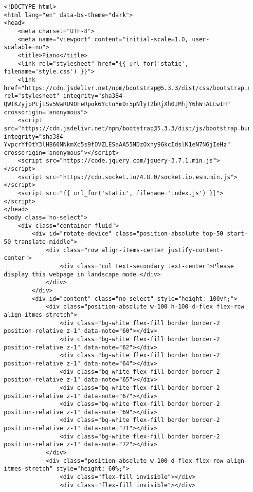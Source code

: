 \documentclass[../main.tex]{subfiles}
\begin{document}
\begin{verbatim}
<!DOCTYPE html>
<html lang="en" data-bs-theme="dark">
<head>
    <meta charset="UTF-8">
    <meta name="viewport" content="initial-scale=1.0, user-scalable=no">
    <title>Piano</title>
    <link rel="stylesheet" href="{{ url_for('static', filename='style.css') }}">
    <link href="https://cdn.jsdelivr.net/npm/bootstrap@5.3.3/dist/css/bootstrap.min.css" rel="stylesheet" integrity="sha384-QWTKZyjpPEjISv5WaRU9OFeRpok6YctnYmDr5pNlyT2bRjXh0JMhjY6hW+ALEwIH" crossorigin="anonymous">
    <script src="https://cdn.jsdelivr.net/npm/bootstrap@5.3.3/dist/js/bootstrap.bundle.min.js" integrity="sha384-YvpcrYf0tY3lHB60NNkmXc5s9fDVZLESaAA55NDzOxhy9GkcIdslK1eN7N6jIeHz" crossorigin="anonymous"></script>
    <script src="https://code.jquery.com/jquery-3.7.1.min.js"></script>
    <script src="https://cdn.socket.io/4.8.0/socket.io.esm.min.js"></script>
    <script src="{{ url_for('static', filename='index.js') }}"></script>
</head>
<body class="no-select">
    <div class="container-fluid">
        <div id="rotate-device" class="position-absolute top-50 start-50 translate-middle">
            <div class="row align-items-center justify-content-center">
                <div class="col text-secondary text-center">Please display this webpage in landscape mode.</div>
            </div>
        </div>
        <div id="content" class="no-select" style="height: 100vh;">
            <div class="position-absolute w-100 h-100 d-flex flex-row align-itmes-stretch">
                <div class="bg-white flex-fill border border-2 position-relative z-1" data-note="60"></div>
                <div class="bg-white flex-fill border border-2 position-relative z-1" data-note="62"></div>
                <div class="bg-white flex-fill border border-2 position-relative z-1" data-note="64"></div>
                <div class="bg-white flex-fill border border-2 position-relative z-1" data-note="65"></div>
                <div class="bg-white flex-fill border border-2 position-relative z-1" data-note="67"></div>
                <div class="bg-white flex-fill border border-2 position-relative z-1" data-note="69"></div>
                <div class="bg-white flex-fill border border-2 position-relative z-1" data-note="71"></div>
                <div class="bg-white flex-fill border border-2 position-relative z-1" data-note="72"></div>
            </div>
            <div class="position-absolute w-100 d-flex flex-row align-itmes-stretch" style="height: 60%;">
                <div class="flex-fill invisible"></div>
                <div class="flex-fill invisible"></div>

\end{verbatim}
\end{document}
